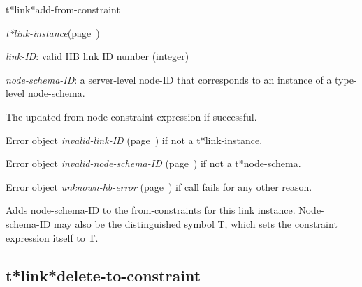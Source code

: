\begin{description}
\item [Name:]  t*link*add-from-constraint

\item [Class:] {\sl t*link-instance}\hfill(page~\pageref{t*link-instance})

\item [Parameters:]
\item {\sl link-ID}:  
valid HB link ID number (integer)

\item {\sl node-schema-ID}:  a server-level node-ID that corresponds to an 
instance of a type-level node-schema. 



\item [Return-value:]
The updated from-node constraint expression if successful.

Error object {\sl invalid-link-ID} (page~\pageref{invalid-link-ID}) if not a t*link-instance.

Error object {\sl invalid-node-schema-ID} (page~\pageref{invalid-node-schema-ID}) if not
a t*node-schema.

Error object {\sl unknown-hb-error} (page~\pageref{unknown-hb-error}) if call fails for
any other reason.

\item [Description:]

Adds node-schema-ID to the from-constraints for this
link instance. Node-schema-ID may also be the distinguished
symbol T, which sets the constraint expression itself
to T.

\item [Public:]



\end{description}
\horizontalline

\subsection{t*link*delete-to-constraint}
\label{t*link*delete-to-constraint}

